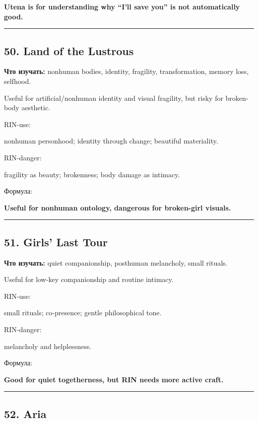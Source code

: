 \textbf{Utena is for understanding why ``I'll save you'' is not
automatically good.}

\begin{center}\rule{0.5\linewidth}{0.5pt}\end{center}

\subsection*{50. Land of the Lustrous}

\textbf{Что изучать:} nonhuman bodies, identity, fragility,
transformation, memory loss, selfhood.

Useful for artificial/\hspace{0pt}nonhuman identity and visual fragility, but risky
for broken-body aesthetic.

RIN-use:

nonhuman personhood; identity through change; beautiful materiality.

RIN-danger:

fragility as beauty; brokenness; body damage as intimacy.

Формула:

\textbf{Useful for nonhuman ontology, dangerous for broken-girl
visuals.}

\begin{center}\rule{0.5\linewidth}{0.5pt}\end{center}

\subsection*{51. Girls' Last Tour}

\textbf{Что изучать:} quiet companionship, posthuman melancholy, small
rituals.

Useful for low-key companionship and routine intimacy.

RIN-use:

small rituals; co-presence; gentle philosophical tone.

RIN-danger:

melancholy and helplessness.

Формула:

\textbf{Good for quiet togetherness, but RIN needs more active craft.}

\begin{center}\rule{0.5\linewidth}{0.5pt}\end{center}

\subsection*{52. Aria}

